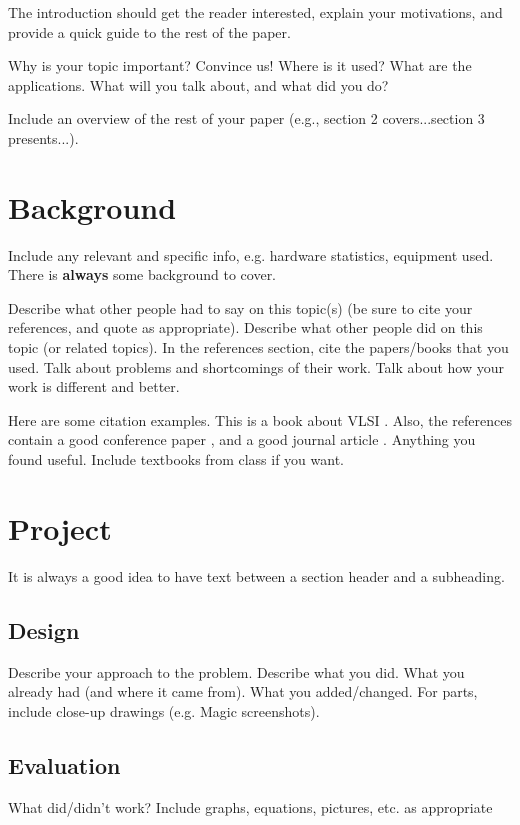 \documentclass[final]{ieee}
\begin{document}
     The introduction should get the reader interested, explain your
     motivations, and provide a quick guide to the rest of the paper.
     
      Why is your topic important? Convince us!
      Where is it used? What are the applications.
      What will you talk about, and what did you do?

     Include an overview of the rest of your paper (e.g., section 2
            covers...section 3 presents...).
            
            
\section{Background}
 
 Include any relevant and specific info,
 e.g. hardware statistics, equipment used.
 There is {\bf always} some background to cover.
            
           Describe what other people had to say on this topic(s)
            (be sure to cite your references, and quote as appropriate).
           Describe what other people did on this topic (or related topics).
           In the references section, cite the papers/books that you used.
Talk about problems and shortcomings of their work.
Talk about how your work is different and better.

Here are some citation examples. 
This is a book about VLSI \cite{Weste93}.
Also, the references contain a good conference paper \cite{LiY88},
and a good journal article \cite{BiS92}.
Anything you found useful.
Include textbooks from class if you want.


\section{Project}

It is always a good idea to have text between a section header and
a subheading.

\subsection{Design}

Describe your approach to the problem.
Describe what you did.
            What you already had (and where it came from).
            What you added/changed.
            For parts, include close-up drawings (e.g. Magic screenshots).
\subsection{Evaluation}
          What did/didn't work?
          Include graphs, equations, pictures, etc. as appropriate
\end{document}
